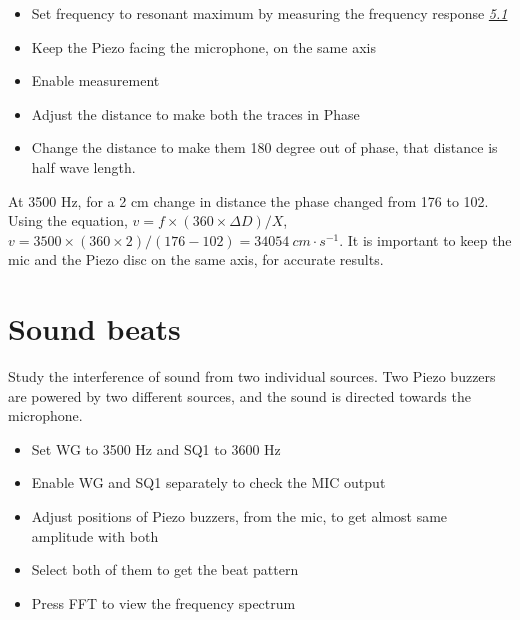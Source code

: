 \documentclass[a4paper,12pt,english]{sphinxmanual}
\let\sphinxpxdimen\pdfpxdimen\else\newdimen\sphinxpxdimen
\begin{document}
\begin{itemize}
\item {} 
Set frequency to resonant maximum by measuring the frequency response
{\hyperref[\detokenize{5.2:sec:Resonance-frequency-of}]{\emph{5.1}}}

\item {} 
Keep the Piezo facing the microphone, on the same axis

\item {} 
Enable measurement

\item {} 
Adjust the distance to make both the traces in Phase

\item {} 
Change the distance to make them 180 degree out of phase, that
distance is half wave length.

\end{itemize}


At 3500 Hz, for a 2 cm change in distance the phase changed from 176 to
102. Using the equation,
\(v = f \times (360 \times \Delta D)/X\), \(v = 3500 \times (360 \times 2)/(176 - 102) = 34054~cm\cdot s^{-1}\). It is important to keep the mic and the Piezo disc on the same
axis, for accurate results.


\section{Sound beats}
\label{\detokenize{5.3:sound-beats}}\label{\detokenize{5.3::doc}}

Study the interference of sound from two individual sources. Two Piezo
buzzers are powered by two different sources, and the sound is directed
towards the microphone.

\noindent\sphinxincludegraphics[width=300\sphinxpxdimen]{{sound-beats}.pdf}

\begin{itemize}
\item {} 
Set WG to 3500 Hz and SQ1 to 3600 Hz

\item {} 
Enable WG and SQ1 separately to check the MIC output

\item {} 
Adjust positions of Piezo buzzers, from the mic, to get almost same
amplitude with both

\item {} 
Select both of them to get the beat pattern

\item {} 
Press FFT to view the frequency spectrum

\end{itemize}
\end{document}
